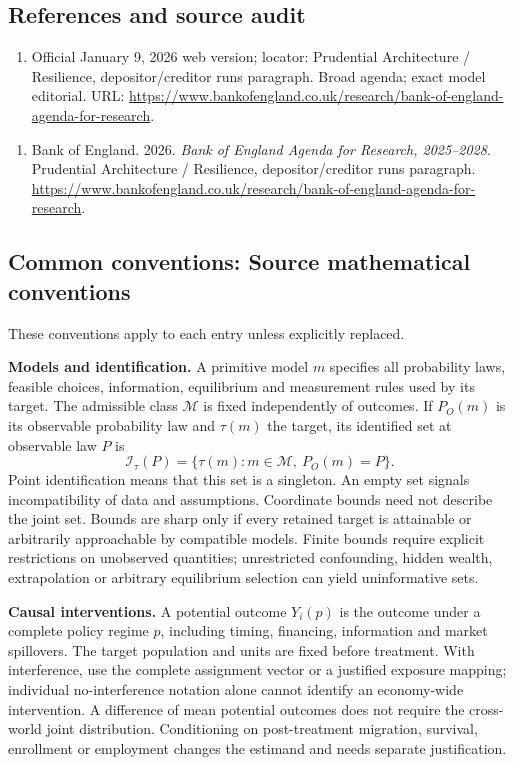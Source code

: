 \documentclass[11pt,a4paper]{article}
\begin{document}
\subsection*{References and source audit}
\begin{enumerate}
\item Official January 9, 2026 web version; locator: Prudential Architecture / Resilience, depositor/creditor runs paragraph. Broad agenda; exact model editorial. URL: \url{https://www.bankofengland.co.uk/research/bank-of-england-agenda-for-research}.
\end{enumerate}
\begin{enumerate}\raggedright
\item\hypertarget{definitions:source:30007604:1}{} Bank of England. 2026. \emph{Bank of England Agenda for Research, 2025–2028}. Prudential Architecture / Resilience, depositor/creditor runs paragraph.
\url{https://www.bankofengland.co.uk/research/bank-of-england-agenda-for-research}.
\end{enumerate}

\subsection*{Common conventions: Source mathematical conventions}

These conventions apply to each entry unless explicitly replaced.

\textbf{Models and identification.} A primitive model \(m\) specifies all probability laws, feasible choices, information, equilibrium and measurement rules used by its target. The admissible class \(\mathcal M\) is fixed independently of outcomes. If \(P_O(m)\) is its observable probability law and \(\tau(m)\) the target, its identified set at observable law \(P\) is
\[
 \mathcal I_\tau(P)=\{\tau(m):m\in\mathcal M,\ P_O(m)=P\}.
\]
Point identification means that this set is a singleton. An empty set signals incompatibility of data and assumptions. Coordinate bounds need not describe the joint set. Bounds are sharp only if every retained target is attainable or arbitrarily approachable by compatible models. Finite bounds require explicit restrictions on unobserved quantities; unrestricted confounding, hidden wealth, extrapolation or arbitrary equilibrium selection can yield uninformative sets.

\textbf{Causal interventions.} A potential outcome \(Y_i(p)\) is the outcome under a complete policy regime \(p\), including timing, financing, information and market spillovers. The target population and units are fixed before treatment. With interference, use the complete assignment vector or a justified exposure mapping; individual no-interference notation alone cannot identify an economy-wide intervention. A difference of mean potential outcomes does not require the cross-world joint distribution. Conditioning on post-treatment migration, survival, enrollment or employment changes the estimand and needs separate justification.
\end{document}
